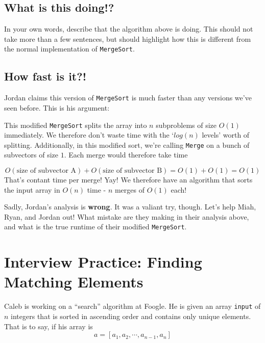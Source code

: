\documentclass [12pt]{article}
\begin{document}
\subsection{What is this doing!?  }
In your own words, describe that the algorithm above is doing. This should not take more than a few sentences, but should highlight how this is different from the normal implementation of \texttt{MergeSort}.


\subsection{How fast is it?! }
Jordan claims this version of \texttt{MergeSort} is much faster than any versions we've seen before. This is his argument:

\begin{displayquote}
    This modified \texttt{MergeSort} splits the array into $n$ subproblems of size $O(1)$ immediately. We therefore don’t waste time with the `$log(n)$ levels’ worth of splitting. Additionally, in this modified sort, we’re calling \texttt{Merge} on a bunch of subvectors of size $1$. Each merge would therefore take time

    $$
        O(\text{size of subvector A}) + O(\text{size of subvector B}) = O(1) + O(1) = O(1)
    $$
    That's contant time per merge! Yay! We therefore have an algorithm that sorts the input array in $O(n)$ time - $n$ merges of $O(1)$ each!
\end{displayquote}

Sadly, Jordan's analysis is \textbf{wrong}. It was a valiant try, though. Let's help Miah, Ryan, and Jordan out! What mistake are they making in their analysis above, and what is the true runtime of their modified \texttt{MergeSort}.



\pagebreak
\section{Interview Practice: Finding Matching Elements }
Caleb is working on a ``search'' algorithm at Foogle. He is given an array \texttt{input} of $n$ integers that is sorted in ascending order and contains only unique elements. That is to say, if his array is
$$
a = [a_1, a_2, \cdots, a_{n-1}, a_n]
$$
\end{document}
